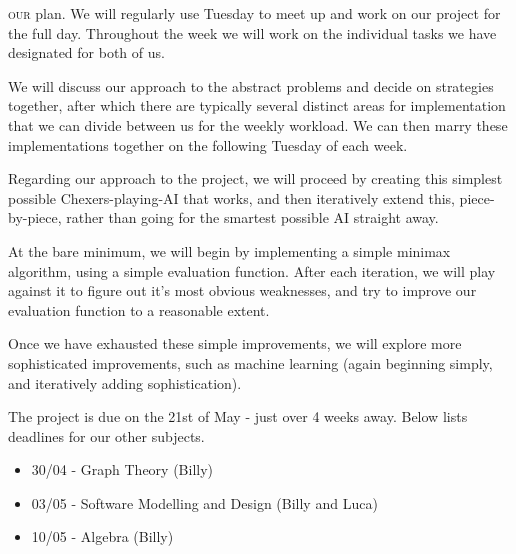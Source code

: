 \documentclass{article}[11pt]
\begin{document}
{\frakfamily\fraklines \lettrine[lines=2]{}{our} plan.
We will regularly use Tuesday to meet up and work on our project for the full day. Throughout the week we will work on the individual tasks we have designated for both of us.

We will discuss our approach to the abstract problems and decide on strategies together, after which there are typically several distinct areas for implementation that we can divide between us for the weekly workload. We can then marry these implementations together on the following Tuesday of each week.

Regarding our approach to the project, we will proceed by creating this simplest possible Chexers-playing-AI that works, and then iteratively extend this, piece-by-piece, rather than going for the smartest possible AI straight away.

At the bare minimum, we will begin by implementing a simple minimax algorithm, using a simple evaluation function. After each iteration, we will play against it to figure out it's most obvious weaknesses, and try to improve our evaluation function to a reasonable extent.

Once we have exhausted these simple improvements, we will explore more sophisticated improvements, such as machine learning (again beginning simply, and iteratively adding sophistication).

The project is due on the 21st of May - just over 4 weeks away. Below lists deadlines for our other subjects.
\begin{itemize}
    \item 30/04 - Graph Theory (Billy)
    \item 03/05 - Software Modelling and Design (Billy and Luca)
    \item 10/05 - Algebra (Billy)
\end{itemize}



}
\end{document}
